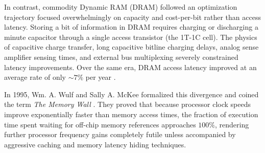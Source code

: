 In contrast, commodity Dynamic RAM (DRAM) followed an optimization trajectory focused overwhelmingly on capacity and cost-per-bit rather than access latency. Storing a bit of information in DRAM requires charging or discharging a minute capacitor through a single access transistor (the 1T-1C cell). The physics of capacitive charge transfer, long capacitive bitline charging delays, analog sense amplifier sensing times, and external bus multiplexing severely constrained latency improvements. Over the same era, DRAM access latency improved at an average rate of only $\sim 7\%$ per year \cite{Patterson97}.

In 1995, Wm. A. Wulf and Sally A. McKee formalized this divergence and coined the term \textit{The Memory Wall} \cite{wulf1995hitting}. They proved that because processor clock speeds improve exponentially faster than memory access times, the fraction of execution time spent waiting for off-chip memory references approaches $100\%$, rendering further processor frequency gains completely futile unless accompanied by aggressive caching and memory latency hiding techniques.

